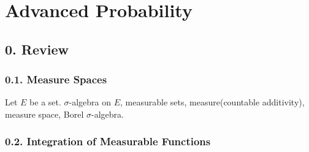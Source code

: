 \documentclass[10pt,a4paper]{report}
\DeclarePairedDelimiter\bignorm{\lVert}{\rVert}
\newcommand{\doublerule}[1][.4pt]{%
  \noindent
  \makebox[0pt][l]{\rule[.7ex]{\linewidth}{#1}}%
  \rule[.3ex]{\linewidth}{#1}}
\begin{document}
\newcommand{\thm}{\textbf{Theorem) }}
\newcommand{\thmnum}[1]{\textbf{Theorem #1) }}
\newcommand{\defi}{\textbf{Definition) }}
\newcommand{\definum}[1]{\textbf{Definition #1) }}
\newcommand{\lem}{\textbf{Lemma) }}
\newcommand{\lemnum}[1]{\textbf{Lemma #1) }}
\newcommand{\prop}{\textbf{Proposition)}}
\newcommand{\propnum}[1]{\textbf{Proposition #1) }}
\newcommand{\corr}{\textbf{Corollary) }}
\newcommand{\corrnum}[1]{\textbf{Corollary #1) }}
\newcommand{\pf}{\textbf{proof) }}


\newcommand{\lap}{\triangle} %
\newcommand{\s}{\vspace{10pt}}
\newcommand{\bull}{$\bullet$}
\newcommand{\sta}{$\star$}
\newcommand{\reals}{\mathbb{R}}

\newcommand{\eop}{\hfill  \textsl{(End of proof)} $\square$} %
\newcommand{\eos}{\hfill  \textsl{(End of statement)} $\square$} %


\newcommand{\intN}{\mathbb{Z}_N}
\newcommand{\nat}{\mathbb{N}}
\newcommand{\norms}[2]{\bignorm[\big]{#1}_{#2}}
\newcommand{\avg}{\mathbb{E}}
\newcommand{\prob}{\mathbb{P}}
\newcommand{\borel}{\mathscr{B}}
\newcommand{\EE}{\mathscr{E}}
\newcommand{\F}{\mathscr{F}}
\newcommand{\G}{\mathscr{F}}
\newcommand{\W}{\mathscr{W}}
\newcommand{\T}{\mathscr{T}}
\newcommand{\cov}{\text{Cov}}
\newcommand{\var}{\text{Var}}
\newcommand{\cha}{1}
\newcommand{\nprob}{\tilde{\prob}}


\newcommand{\newday}{\doublerule[0.5pt]}

\setlength\parindent{0pt}

\chapter*{Advanced Probability}

\section*{0. Review}

\subsection*{0.1. Measure Spaces}

Let $E$ be a set. $\sigma$-algebra on $E$, measurable sets, measure(countable additivity), measure space, Borel $\sigma$-algebra.

\subsection*{0.2. Integration of Measurable Functions}
\end{document}
